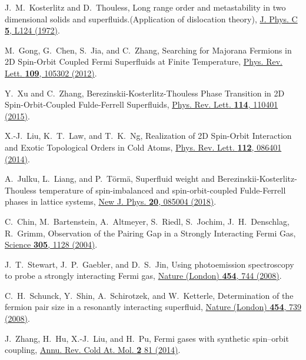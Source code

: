 \documentclass[twocolumn,english,prl,floatfix,citeautoscript,nofootinbib]{revtex4}
\begin{document}
\begin{thebibliography}{999}
 J.~M.~Kosterlitz and D.~Thouless, Long range
order and metastability in two dimensional solids and
superfluids.(Application of dislocation theory), \href{http://dx.doi.org/10.1088/0022-3719/5/11/002}%
{J. Phys. C \textbf{5}, L124 (1972)}.

 M.~Gong, G.~Chen, S.~Jia, and C.~Zhang,
Searching for Majorana Fermions in 2D Spin-Orbit Coupled Fermi Superfluids
at Finite Temperature, \href{https://doi.org/10.1103/PhysRevLett.109.105302}{%
Phys. Rev. Lett. \textbf{109}, 105302 (2012)}.

 Y.~Xu and C.~Zhang,
Berezinskii-Kosterlitz-Thouless Phase Transition in 2D Spin-Orbit-Coupled
Fulde-Ferrell Superfluids, \href{https://doi.org/10.1103/PhysRevLett.114.110401}%
{Phys. Rev. Lett. \textbf{114}, 110401 (2015)}.

 X.-J.~Liu, K.~T.~Law, and T.~K.~Ng,
Realization of 2D Spin-Orbit Interaction and Exotic Topological Orders in
Cold Atoms, \href{https://doi.org/10.1103/PhysRevLett.112.086401}{Phys. Rev.
Lett. \textbf{112}, 086401 (2014)}.

 A.~Julku, L.~Liang, and P.~T{\"o}rm{\"a},
Superfluid weight and Berezinskii-Kosterlitz-Thouless temperature of
spin-imbalanced and spin-orbit-coupled Fulde-Ferrell phases in lattice
systems, \href{https://doi.org/10.1088/1367-2630/aad891}{New J. Phys.
\textbf{20}, 085004 (2018)}.


 C.~Chin, M.~Bartenstein, A.~Altmeyer, S.~Riedl,
S.~Jochim, J.~H.~Denschlag, R.~Grimm, Observation of the Pairing Gap in a
Strongly Interacting Fermi Gas, \href{https://doi.org/10.1126/science.1100818}%
{Science \textbf{305}, 1128 (2004)}.

 J.~T.~Stewart, J.~P.~Gaebler, and D.~S.~Jin, Using
photoemission spectroscopy to probe a strongly interacting Fermi gas, \href{https://doi.org/10.1038/nature07172}%
{Nature (London) \textbf{454}, 744 (2008)}.

 C.~H.~Schunck, Y.~Shin, A.~Schirotzek, and
W.~Ketterle, Determination of the fermion pair size in a resonantly
interacting superfluid, \href{https://doi.org/10.1038/nature07176}{Nature
(London) \textbf{454}, 739 (2008)}.

 J.~Zhang, H.~Hu, X.-J.~Liu, and H.~Pu, \newblock %
Fermi gases with synthetic spin--orbit coupling, \newblock \href{http://doi.org/10.1142/9789814590174_0002}%
{Annu. Rev. Cold At. Mol. \textbf{2} 81 (2014)}.


\end{thebibliography}
\end{document}
